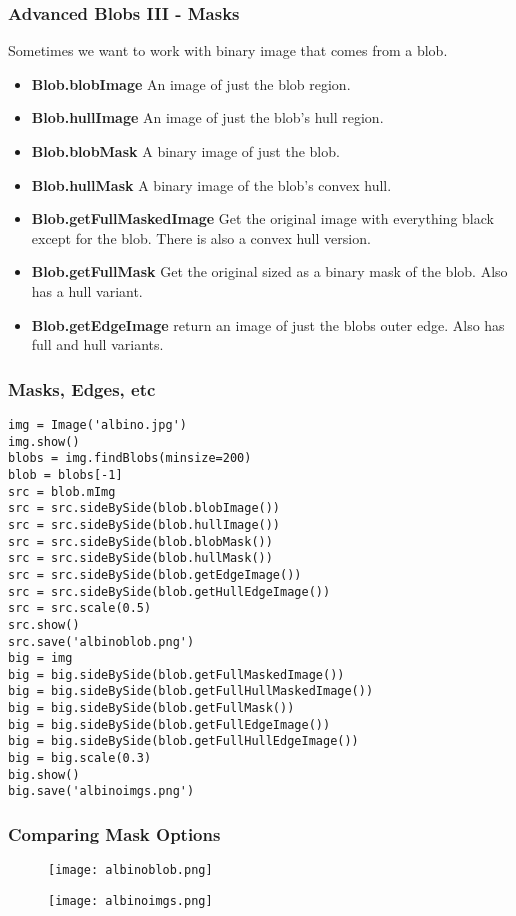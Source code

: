 \documentclass[compress]{beamer}
\begin{document}
\begin{frame}
  \frametitle{Advanced Blobs III - Masks}
Sometimes we want to work with binary image that comes from a blob.
\begin{itemize}
\item \textbf{Blob.blobImage} An image of just the blob region.
\item \textbf{Blob.hullImage} An image of just the blob's hull region.
\item \textbf{Blob.blobMask} A binary image of just the blob.
\item \textbf{Blob.hullMask} A binary image of the blob's convex hull.
\item \textbf{Blob.getFullMaskedImage} Get the original image with
  everything black except for the blob. There is also a convex hull version.
\item \textbf{Blob.getFullMask} Get the original sized as a binary
  mask of the blob. Also has a hull variant.
\item \textbf{Blob.getEdgeImage} return an image of just the blobs
  outer edge. Also has full and hull variants. 
\end{itemize}
\end{frame}
\begin{frame}[fragile] 
\frametitle{Masks, Edges, etc}
\begin{example}
\begin{verbatim}
img = Image('albino.jpg')
img.show()
blobs = img.findBlobs(minsize=200)
blob = blobs[-1]
src = blob.mImg
src = src.sideBySide(blob.blobImage())
src = src.sideBySide(blob.hullImage())
src = src.sideBySide(blob.blobMask())
src = src.sideBySide(blob.hullMask())
src = src.sideBySide(blob.getEdgeImage())
src = src.sideBySide(blob.getHullEdgeImage())
src = src.scale(0.5)
src.show()
src.save('albinoblob.png')
big = img
big = big.sideBySide(blob.getFullMaskedImage())
big = big.sideBySide(blob.getFullHullMaskedImage())
big = big.sideBySide(blob.getFullMask())
big = big.sideBySide(blob.getFullEdgeImage())
big = big.sideBySide(blob.getFullHullEdgeImage())
big = big.scale(0.3)
big.show()
big.save('albinoimgs.png')
\end{verbatim}
\end{example}
\end{frame}
\begin{frame}
\frametitle{Comparing Mask Options}
 \begin{figure}
     \texttt{[image: albinoblob.png]}
 \end{figure}
 \begin{figure}
     \texttt{[image: albinoimgs.png]}
 \end{figure}
\end{frame}
\end{document}
